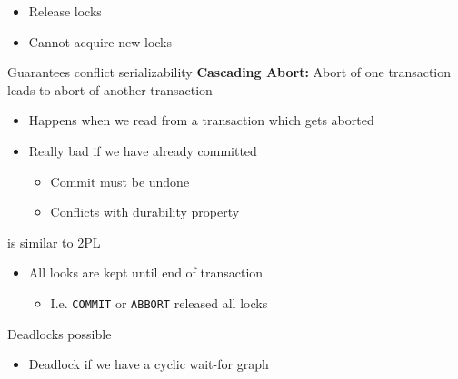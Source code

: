 \begin{itemize}
\begin{itemize}
\begin{itemize}
\begin{itemize}
                            \item Release locks
                            \item Cannot acquire new locks
                        \end{itemize}
                \end{itemize}
            \ipro Guarantees conflict serializability
            \icon \textbf{Cascading Abort:} Abort of one transaction leads to abort of another transaction
                \begin{itemize}
                    \item Happens when we read from a transaction which gets aborted
                    \item Really bad if we have already committed
                        \begin{itemize}
                            \item Commit must be undone
                            \item Conflicts with durability property
                        \end{itemize}
                \end{itemize}
        \end{itemize}
        \begin{itemize}
             is similar to 2PL
                \begin{itemize}
                    \item All looks are kept until end of transaction
                        \begin{itemize}
                            \item I.e. \verb+COMMIT+ or \verb+ABBORT+ released all locks
                        \end{itemize}
                \end{itemize}
            \icon Deadlocks possible
                \begin{itemize}
                        \begin{itemize}
                            \item Each transaction is a node
                            \item $\exists$ edge $T_i$ to $T_j$ if $T_i$ is waiting for a lock currently hold by $T_j$
                        \end{itemize}
                    \item Deadlock if we have a cyclic wait-for graph

\end{itemize}
\end{itemize}
\end{itemize}
